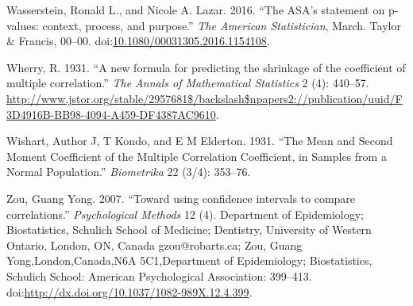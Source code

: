 \documentclass[]{article}
\begin{document}
\hypertarget{ref-Wasserstein2016}{}
Wasserstein, Ronald L., and Nicole A. Lazar. 2016. ``The ASA's statement
on p-values: context, process, and purpose.'' \emph{The American
Statistician}, March. Taylor \& Francis, 00--00.
doi:\href{https://doi.org/10.1080/00031305.2016.1154108}{10.1080/00031305.2016.1154108}.

\hypertarget{ref-Wherry1931}{}
Wherry, R. 1931. ``A new formula for predicting the shrinkage of the
coefficient of multiple correlation.'' \emph{The Annals of Mathematical
Statistics} 2 (4): 440--57.
\url{http://www.jstor.org/stable/2957681$/backslash$npapers2://publication/uuid/F3D4916B-BB98-4094-A459-DF4387AC9610}.

\hypertarget{ref-Wishart1931}{}
Wishart, Author J, T Kondo, and E M Elderton. 1931. ``The Mean and
Second Moment Coefficient of the Multiple Correlation Coefficient, in
Samples from a Normal Population.'' \emph{Biometrika} 22 (3/4): 353--76.

\hypertarget{ref-Zou2007}{}
Zou, Guang Yong. 2007. ``Toward using confidence intervals to compare
correlations.'' \emph{Psychological Methods} 12 (4). Department of
Epidemiology; Biostatistics, Schulich School of Medicine; Dentistry,
University of Western Ontario, London, ON, Canada gzou@robarts.ca; Zou,
Guang Yong,London,Canada,N6A 5C1,Department of Epidemiology;
Biostatistics, Schulich School: American Psychological Association:
399--413.
doi:\href{https://doi.org/http://dx.doi.org/10.1037/1082-989X.12.4.399}{http://dx.doi.org/10.1037/1082-989X.12.4.399}.
\end{document}
